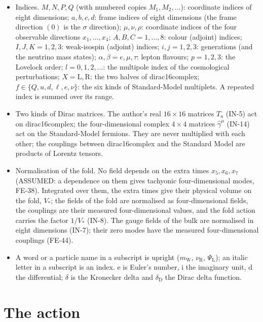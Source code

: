 \documentclass[
  10pt,
]{article}
\providecommand{\tightlist}{%
  \setlength{\itemsep}{0pt}\setlength{\parskip}{0pt}}
\begin{document}
\begin{itemize}
\tightlist
\item
  Indices. \(M, N, P, Q\) (with numbered copies \(M_1, M_2, \dots\)):
  coordinate indices of eight dimensions; \(a, b, c, d\): frame indices
  of eight dimensions (the frame direction \((0)\) is the \(\sigma\)
  direction); \(\mu, \nu, \rho\): coordinate indices of the four
  observable directions \(x_1, \dots, x_4\); \(A, B, C = 1, \dots, 8\):
  colour (adjoint) indices; \(I, J, K = 1, 2, 3\): weak-isospin
  (adjoint) indices; \(i, j = 1, 2, 3\): generations (and the neutrino
  mass states); \(\alpha, \beta = e, \mu, \tau\): lepton flavours;
  \(p = 1, 2, 3\): the Lovelock order; \(l = 0, 1, 2, \dots\): the
  multipole index of the cosmological perturbations;
  \(X = \mathrm{L}, \mathrm{R}\): the two halves of dirac16complex;
  \(f \in \{Q, u, d, \ell, e, \nu\}\): the six kinds of Standard-Model
  multiplets. A repeated index is summed over its range.
\item
  Two kinds of Dirac matrices. The author's real \(16 \times 16\)
  matrices \(T_a\) (IN-5) act on dirac16complex; the four-dimensional
  complex \(4 \times 4\) matrices \(\hat\gamma^\mu\) (IN-14) act on the
  Standard-Model fermions. They are never multiplied with each other;
  the couplings between dirac16complex and the Standard Model are
  products of Lorentz tensors.
\item
  Normalisation of the fold. No field depends on the extra times
  \(x_5, x_6, x_7\) (ASSUMED: a dependence on them gives tachyonic
  four-dimensional modes, FE-38). Integrated over them, the extra times
  give their physical volume on the fold, \(V_*\); the fields of the
  fold are normalised as four-dimensional fields, the couplings are
  their measured four-dimensional values, and the fold action carries
  the factor \(1/V_*\) (IN-8). The gauge fields of the bulk are
  normalised in eight dimensions (IN-7); their zero modes have the
  measured four-dimensional couplings (FE-44).
\item
  A word or a particle name in a subscript is upright
  (\(m_{\mathrm{W}}\), \(\nu_{\mathrm{R}}\), \(\Psi_{\mathrm{L}}\)); an
  italic letter in a subscript is an index. \(\mathrm{e}\) is Euler's
  number, \(\mathrm{i}\) the imaginary unit, \(\mathrm{d}\) the
  differential; \(\delta\) is the Kronecker delta and
  \(\delta_{\mathrm{D}}\) the Dirac delta function.
\end{itemize}

\hypertarget{the-action}{%
\section{The action}\label{the-action}}
\end{document}
